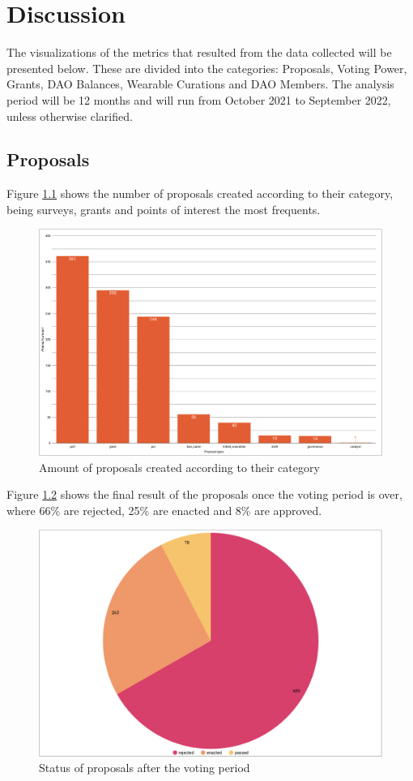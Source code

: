 \documentclass[MSE,Master,english]{twbook}%
\begin{document}
\chapter{Discussion\label{discussion}}
The visualizations of the metrics that resulted from the data collected will be presented below. These are divided into the categories: Proposals, Voting Power, Grants, DAO Balances, Wearable Curations and DAO Members. The analysis period will be 12 months and will run from October 2021 to September 2022, unless otherwise clarified.

\section{Proposals}
Figure \ref{fig:proposal_types} shows the number of proposals created according to their category, being surveys, grants and points of interest the most frequents.
\begin{figure}[H]
  \centering
  \includegraphics[width=\textwidth]{metrics/proposal_types.png}
  \caption{Amount of proposals created according to their category}
  \label{fig:proposal_types}
\end{figure}

Figure \ref{fig:proposal_status} shows the final result of the proposals once the voting period is over, where 66\% are rejected, 25\% are enacted and 8\% are approved.
\begin{figure}[H]
  \centering
  \includegraphics[width=\textwidth]{metrics/proposal_status.png}
  \caption{Status of proposals after the voting period}
  \label{fig:proposal_status}
\end{figure}
\end{document}
